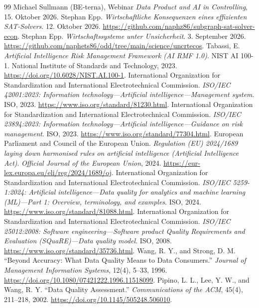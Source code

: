 \documentclass[a4paper,12pt,twoside]{report}
\theoremstyle{definition}
\begin{document}

\begin{thebibliography}{99}
 Michael Sullmann (BE-terna), Webinar \textit{Data Product and AI in Controlling}, 15. Oktober 2026.
 Stephan Epp. \emph{Wirtschaftliche Konsequenzen eines effizienten SAT-Solvers}. 12. Oktober 2026. \url{https://github.com/naphz86/subgraph-sat-solver-econ}.
 Stephan Epp. \emph{Wirtschaftssysteme unter Unsicherheit}. 3. September 2026. \url{https://github.com/naphets86/odd/tree/main/science/uncrtecos}.
 Tabassi, E. \emph{Artificial Intelligence Risk Management Framework (AI RMF 1.0)}. NIST AI 100-1. National Institute of Standards and Technology, 2023. \url{https://doi.org/10.6028/NIST.AI.100-1}.
 International Organization for Standardization and International Electrotechnical Commission. \emph{ISO/IEC 42001:2023: Information technology---Artificial intelligence---Management system}. ISO, 2023. \url{https://www.iso.org/standard/81230.html}.
 International Organization for Standardization and International Electrotechnical Commission. \emph{ISO/IEC 23894:2023: Information technology---Artificial intelligence---Guidance on risk management}. ISO, 2023. \url{https://www.iso.org/standard/77304.html}.
 European Parliament and Council of the European Union. \emph{Regulation (EU) 2024/1689 laying down harmonised rules on artificial intelligence (Artificial Intelligence Act)}. \emph{Official Journal of the European Union}, 2024. \url{https://eur-lex.europa.eu/eli/reg/2024/1689/oj}.
 International Organization for Standardization and International Electrotechnical Commission. \emph{ISO/IEC 5259-1:2024: Artificial intelligence---Data quality for analytics and machine learning (ML)---Part 1: Overview, terminology, and examples}. ISO, 2024. \url{https://www.iso.org/standard/81088.html}.
 International Organization for Standardization and International Electrotechnical Commission. \emph{ISO/IEC 25012:2008: Software engineering---Software product Quality Requirements and Evaluation (SQuaRE)---Data quality model}. ISO, 2008. \url{https://www.iso.org/standard/35736.html}.
 Wang, R. Y., and Strong, D. M. ``Beyond Accuracy: What Data Quality Means to Data Consumers.'' \emph{Journal of Management Information Systems}, 12(4), 5--33, 1996. \url{https://doi.org/10.1080/07421222.1996.11518099}.
 Pipino, L. L., Lee, Y. W., and Wang, R. Y. ``Data Quality Assessment.'' \emph{Communications of the ACM}, 45(4), 211--218, 2002. \url{https://doi.org/10.1145/505248.506010}.

\end{thebibliography}
\end{document}
